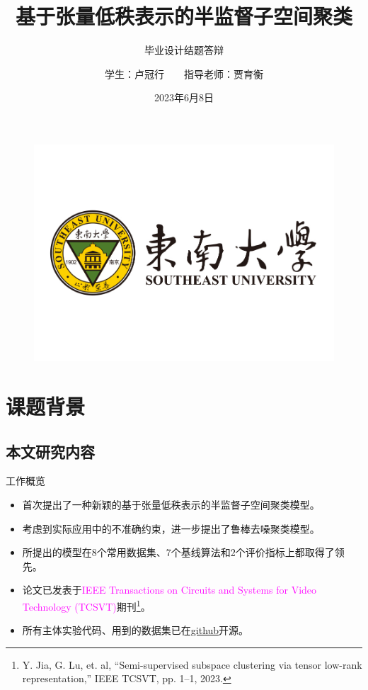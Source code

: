 \documentclass{beamer}
\author{学生：卢冠行~~~~指导老师：贾育衡}
\title{基于张量低秩表示的半监督子空间聚类}
\subtitle{毕业设计结题答辩}
\institute{东南大学吴健雄学院}
\date{2023年6月8日}
\begin{document}
\kaishu
\begin{frame}
    \titlepage
    \begin{figure}[htpb]
        \begin{center}
            \includegraphics[width=0.25\linewidth]{pic/CLTlogo.jpg}
        \end{center}
    \end{figure}
\end{frame}

\begin{frame}
    \tableofcontents[sectionstyle=show,subsectionstyle=show/shaded/hide,subsubsectionstyle=show/shaded/hide]
\end{frame}


\section{课题背景}

\subsection{本文研究内容}

\begin{frame}{工作概览}

    \begin{itemize}
        \item 首次提出了一种新颖的基于张量低秩表示的半监督子空间聚类模型。
        \vspace{0.05cm}
        \item 考虑到实际应用中的不准确约束，进一步提出了鲁棒去噪聚类模型。
        \vspace{0.05cm}
        \item 所提出的模型在8个常用数据集、7个基线算法和2个评价指标上都取得了领先。
        \vspace{0.05cm}
        \item 论文已发表于\textcolor{magenta}{IEEE Transactions on Circuits and Systems for Video Technology (TCSVT)}期刊\footnote{\scriptsize\cite{10007868} Y. Jia, G. Lu, et. al, “Semi-supervised subspace clustering via tensor
low-rank representation,” IEEE TCSVT, pp. 1–1, 2023.}。
        \vspace{0.05cm}
        \item 所有主体实验代码、用到的数据集已在\href{https://github.com/GuanxingLu/Subspace-Clustering}{github}开源。
        
    \end{itemize}
\end{frame}
\end{document}
